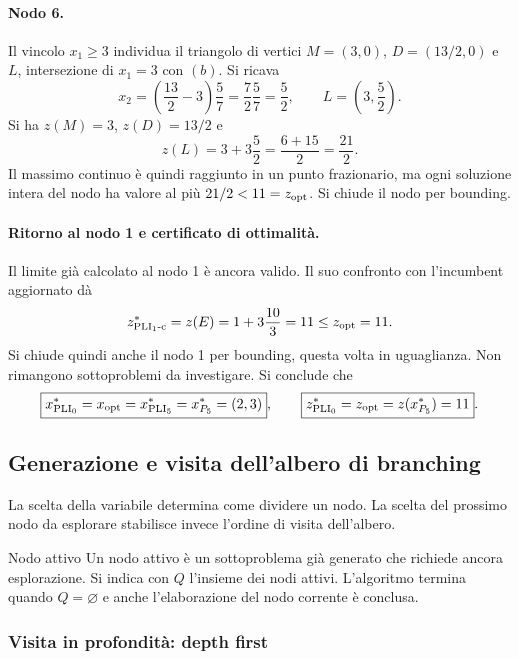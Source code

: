 \paragraph{Nodo 6.}
Il vincolo $x_1\geq3$ individua il triangolo di vertici
$M=(3,0)$, $D=(13/2,0)$ e $L$, intersezione di $x_1=3$ con $(b)$.
Si ricava
\[
 x_2=\left(\frac{13}{2}-3\right)\frac57
     =\frac72\frac57=\frac52,
 \qquad L=\left(3,\frac52\right).
\]
Si ha $z(M)=3$, $z(D)=13/2$ e
\[
 z(L)=3+3\frac52=\frac{6+15}{2}=\frac{21}{2}.
\]
Il massimo continuo è quindi raggiunto in un punto frazionario, ma ogni
soluzione intera del nodo ha valore al più $21/2<11=z_{\mathrm{opt}}$. Si chiude
il nodo per bounding.

\paragraph{Ritorno al nodo 1 e certificato di ottimalità.}
Il limite già calcolato al nodo 1 è ancora valido. Il suo confronto con
l'incumbent aggiornato dà
\[
 z^*_{\mathrm{PLI}_{1}\text{-c}}=z(E)=1+3\frac{10}{3}=11\leq z_{\mathrm{opt}}=11.
\]
Si chiude quindi anche il nodo 1 per bounding, questa volta in uguaglianza.
Non rimangono sottoproblemi da investigare. Si conclude che
\[
 \boxed{x^*_{\mathrm{PLI}_{0}}=x_{\mathrm{opt}}=x^*_{\mathrm{PLI}_{5}}=x^*_{P_5}=(2,3)},
 \qquad
 \boxed{z^*_{\mathrm{PLI}_{0}}=z_{\mathrm{opt}}=z(x^*_{P_5})=11}.
\]

\subsection{Generazione e visita dell'albero di branching}

La scelta della variabile determina come dividere un nodo. La scelta del
prossimo nodo da esplorare stabilisce invece l'ordine di visita dell'albero.

\begin{definition}{Nodo attivo}
Un nodo attivo è un sottoproblema già generato che richiede ancora
esplorazione. Si indica con $Q$ l'insieme dei nodi attivi. L'algoritmo
termina quando $Q=\varnothing$ e anche l'elaborazione del nodo corrente
è conclusa.
\end{definition}

\subsubsection{Visita in profondità: depth first}

